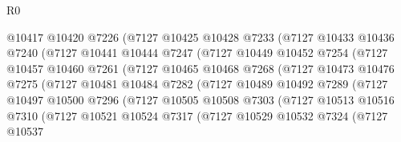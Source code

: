 \begin{lexlean}{R0}
\begin{coremodule}
                      @10417
                      @10420
                      @7226
                      (@7127
                        @10425
                        @10428
                        @7233
                        (@7127
                          @10433
                          @10436
                          @7240
                          (@7127
                            @10441
                            @10444
                            @7247
                            (@7127
                              @10449
                              @10452
                              @7254
                              (@7127
                                @10457
                                @10460
                                @7261
                                (@7127
                                  @10465
                                  @10468
                                  @7268
                                  (@7127
                                    @10473
                                    @10476
                                    @7275
                                    (@7127
                                      @10481
                                      @10484
                                      @7282
                                      (@7127
                                        @10489
                                        @10492
                                        @7289
                                        (@7127
                                          @10497
                                          @10500
                                          @7296
                                          (@7127
                                            @10505
                                            @10508
                                            @7303
                                            (@7127
                                              @10513
                                              @10516
                                              @7310
                                              (@7127
                                                @10521
                                                @10524
                                                @7317
                                                (@7127
                                                  @10529
                                                  @10532
                                                  @7324
                                                  (@7127
                                                    @10537

\end{coremodule}
\end{lexlean}
